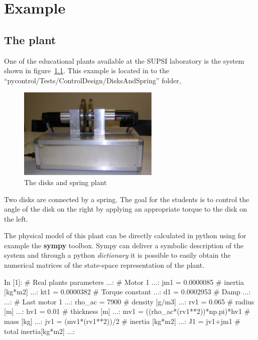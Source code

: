 \chapter{Example}
\section{The plant}

One of the educational plants available at the SUPSI laboratory is the system 
shown in figure~\ref{F20}. This example is located in to the 
``pycontrol/Tests/ControlDesign/DisksAndSpring'' folder,

\begin{figure}[htbp]	%
\centering
\includegraphics[width=0.6\textwidth]{eps/disks.eps}
\caption{The disks and spring plant}
\label{F20}
\end{figure}

Two disks are connected by a spring. The goal for the students is to control 
the angle of the disk on the right by applying an appropriate torque to the 
disk on the left.

The physical model of this plant can be directly calculated in python using for 
example the \textbf{sympy} toolbox.
Sympy can deliver a symbolic description of the system and through a python 
\textit{dictionary} it is possible to easily obtain the numerical matrices of 
the state-space representation of the plant.

\begin{code}
In [1]: # Real plants parameters
   ...: # Motor 1
   ...: jm1 = 0.0000085  # inertia [kg*m2]
   ...: kt1 = 0.0000382  # Torque constant
   ...: d1 = 0.0002953  # Damp
   ...: 
   ...: # Last motor 1
   ...: rho_ac = 7900  # density [g/m3]
   ...: rv1 = 0.065    # radius [m] 
   ...: hv1 = 0.01     # thickness [m]
   ...: mv1 = ((rho_ac*(rv1**2))*np.pi)*hv1   # mass [kg]
   ...: jv1 = (mv1*(rv1**2))/2   # inertia [kg*m2]
   ...: J1 = jv1+jm1   # total inertia[kg*m2]
   ...: 
\end{code}

